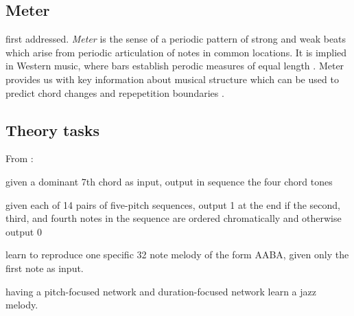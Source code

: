 \documentclass[dissertation.tex]{subfiles}
\begin{document}
\subsection{Meter}

\cite{eck2008learning} first addressed. \emph{Meter} is the sense of a periodic
pattern of strong and weak beats which arise from periodic articulation of
notes in common locations. It is implied in Western music, where bars establish
perodic measures of equal length \cite{handel1993listening}. Meter provides us
with key information about musical structure which can be used to predict chord
changes and repepetition boundaries \cite{cooper1963rhythmic}.

\subsection{Theory tasks}

From \cite{franklin2006recurrent}:

given a dominant 7th chord as input, output in sequence the four chord tones

given each of 14 pairs of five-pitch sequences, output 1 at the end if the second, third, and fourth notes in the sequence are ordered chromatically and otherwise output 0

learn to reproduce one specific 32 note melody of the form AABA, given only the first note as input.

having a pitch-focused network and duration-focused network learn a jazz melody.

\printbibliography
\end{document}
